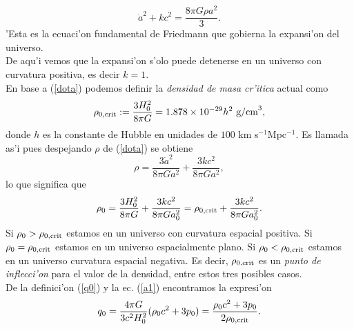 \begin{equation}
\boxed{\dot a^2 +kc^2  = \frac{8\pi G\rho a^2}{3}.} \label{dota}
\end{equation}
'Esta es la ecuaci'on fundamental de Friedmann \cite{friedmann} que gobierna la expansi'on del universo.\\
De aqu'i vemos que la expansi'on s'olo puede detenerse en un universo con curvatura positiva, es decir $k=1$.\\
En base a (\ref{dota}) podemos definir la \textit{densidad de masa cr'itica} actual como
\begin{equation}
\rho_{0\rm{,crit}}:= \frac{3H_0^2}{8\pi G} = 1.878\times 10^{-29} h^2 \mbox{ g/cm}^3,
\end{equation}
donde $h$ es la constante de Hubble en unidades de $100$ km s$^{-1}$Mpc$^{-1}$. Es llamada as'i pues despejando $\rho$ de
(\ref{dota}) se obtiene
\begin{equation}
\rho = \frac{3\dot a^2}{8\pi Ga^2} + \frac{3kc^2}{8\pi Ga^2}, \label{densidad}
\end{equation}
lo que significa que
\begin{equation}
\rho_0 = \frac{3 H_0^2}{8\pi G} + \frac{3kc^2}{8\pi Ga_0^2} = \rho_{0\rm{,crit}} + \frac{3kc^2}{8\pi Ga_0^2}. 
\end{equation}
Si $\rho_0 > \rho_{0\rm{,crit}}$ estamos en un universo con curvatura espacial positiva.
Si $\rho_0=\rho_{0\rm{,crit}}$ estamos en un universo espacialmente plano. Si $\rho_0<\rho_{0\rm{,crit}}$ estamos en un universo curvatura espacial negativa.
Es decir, $\rho_{0\rm{,crit}}$ es un \textit{punto de inflecci'on} para el valor de la densidad, entre estos tres posibles casos.\\
De la definici'on (\ref{q0}) y la ec. (\ref{a1}) encontramos la expresi'on
\begin{equation}
q_{0}=\frac{4\pi G}{3c^2 H_0^2}(\rho_0 c^2 +3p_0)=\frac{\rho_0 c^2 +3p_0}{2\rho_{0\rm{,crit}}} . \label{q00}
\end{equation}

